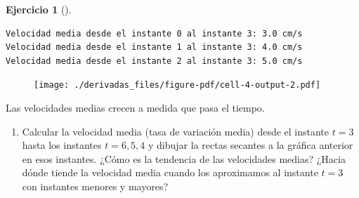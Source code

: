 \documentclass[
  a4paper,
]{scrreport}
\newenvironment{Shaded}{\begin{snugshade}}{\end{snugshade}}
\newcommand{\CommentTok}[1]{\textcolor[rgb]{0.37,0.37,0.37}{#1}}
\newcommand{\ControlFlowTok}[1]{\textcolor[rgb]{0.00,0.23,0.31}{#1}}
\newcommand{\FloatTok}[1]{\textcolor[rgb]{0.68,0.00,0.00}{#1}}
\newcommand{\FunctionTok}[1]{\textcolor[rgb]{0.28,0.35,0.67}{#1}}
\newcommand{\KeywordTok}[1]{\textcolor[rgb]{0.00,0.23,0.31}{#1}}
\newcommand{\NormalTok}[1]{\textcolor[rgb]{0.00,0.23,0.31}{#1}}
\newcommand{\OperatorTok}[1]{\textcolor[rgb]{0.37,0.37,0.37}{#1}}
\newcommand{\SpecialCharTok}[1]{\textcolor[rgb]{0.37,0.37,0.37}{#1}}
\newcommand{\StringTok}[1]{\textcolor[rgb]{0.13,0.47,0.30}{#1}}
\providecommand{\tightlist}{%
  \setlength{\itemsep}{0pt}\setlength{\parskip}{0pt}}\usepackage{longtable,booktabs,array}
\theoremstyle{definition}
\newtheorem{exercise}{Ejercicio}[chapter]
\theoremstyle{remark}
\begin{document}
\begin{exercise}[]
\begin{tcolorbox}
\begin{verbatim}
Velocidad media desde el instante 0 al instante 3: 3.0 cm/s
Velocidad media desde el instante 1 al instante 3: 4.0 cm/s
Velocidad media desde el instante 2 al instante 3: 5.0 cm/s
\end{verbatim}

\begin{figure}[H]

{\centering \texttt{[image: ./derivadas\_files/figure-pdf/cell-4-output-2.pdf]}

}

\end{figure}

Las velocidades medias crecen a medida que pasa el tiempo.

\end{tcolorbox}

\begin{enumerate}
\def\labelenumi{\alph{enumi}.}
\setcounter{enumi}{2}
\tightlist
\item
  Calcular la velocidad media (tasa de variación media) desde el
  instante \(t=3\) hasta los instantes \(t=6, 5, 4\) y dibujar la rectas
  secantes a la gráfica anterior en esos instantes. ¿Cómo es la
  tendencia de las velocidades medias? ¿Hacia dónde tiende la velocidad
  media cuando los aproximamos al instante \(t=3\) con instantes menores
  y mayores?
\end{enumerate}

\begin{tcolorbox}[enhanced jigsaw, toprule=.15mm, arc=.35mm, bottomrule=.15mm, titlerule=0mm, bottomtitle=1mm, opacitybacktitle=0.6, colbacktitle=quarto-callout-tip-color!10!white, colframe=quarto-callout-tip-color-frame, opacityback=0, title=\textcolor{quarto-callout-tip-color}{\faLightbulb}\hspace{0.5em}{Solución}, breakable, colback=white, toptitle=1mm, leftrule=.75mm, coltitle=black, rightrule=.15mm, left=2mm]

\begin{Shaded}
\end{Shaded}


\end{tcolorbox}
\end{exercise}
\end{document}

